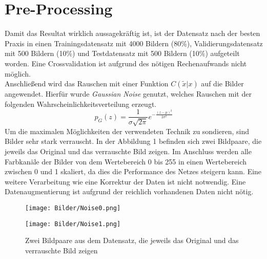 \documentclass[conference]{IEEEtran}
\begin{document}
\section{Pre-Processing}
Damit das Resultat wirklich aussagekräftig ist, ist der Datensatz nach der besten Praxis in einen Trainingsdatensatz mit 4000 Bildern (80\%), Validierungsdatensatz mit 500 Bildern (10\%) und Testdatensatz mit 500 Bildern (10\%) aufgeteilt worden. Eine Crossvalidation ist aufgrund des nötigen Rechenaufwands nicht möglich.\\
Anschließend wird das Rauschen mit einer Funktion $C(\tilde{x} | x)$ auf die Bilder angewendet. Hierfür wurde \textit{Gaussian Noise} genutzt, welches Rauschen mit der folgenden Wahrscheinlichkeitsverteilung erzeugt.
\[ p_{G}(z)={\frac{1}{\sigma {\sqrt  {2\pi }}}}e^{{-{\frac  {(z-\mu )^{2}}{2\sigma ^{2}}}}} \]
Um die maximalen Möglichkeiten der verwendeten Technik zu sondieren, sind Bilder sehr stark verrauscht. In der Abbildung 1 befinden sich zwei Bildpaare, die jeweils das Original und das verrauschte Bild zeigen. Im Anschluss werden alle Farbkanäle der Bilder von dem Wertebereich 0 bis 255 in einen Wertebereich zwischen 0 und 1 skaliert, da dies die Performance des Netzes steigern kann.
Eine weitere Verarbeitung wie eine Korrektur der Daten ist nicht notwendig. Eine Datenaugmentierung ist aufgrund der reichlich vorhandenen Daten nicht nötig.
\begin{figure}[h]
	\begin{minipage}[t]{.21\textwidth}
		\begin{center}  
			\texttt{[image: Bilder/Noise0.png]}
			\label{fig-noise}
		\end{center}
	\end{minipage}
	\hspace{0.5cm}
	\begin{minipage}[t]{.21\textwidth}
		\begin{center}  
			\texttt{[image: Bilder/Noise1.png]}
			\label{fig-noise}
		\end{center}
	\end{minipage}
	\label{fig-noise}
	\caption{Zwei Bildpaare aus dem Datensatz, die jeweils das Original und das verrauschte Bild zeigen}
\end{figure}
\end{document}
